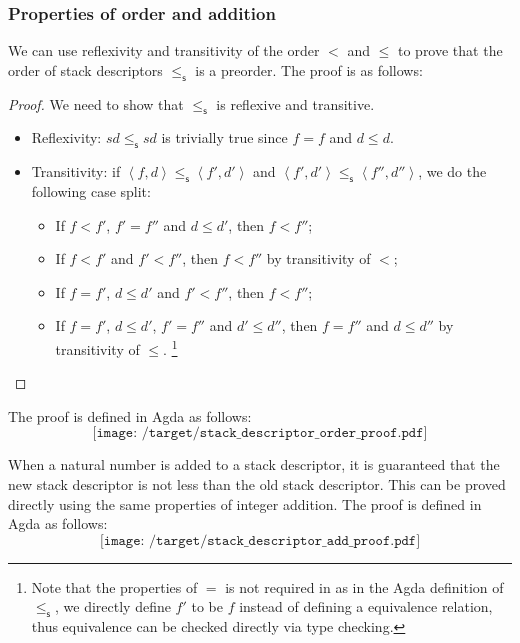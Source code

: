 \documentclass[12pt,a4paper]{report}
\theoremstyle{definition}
\newcommand{\ang}[1]{\left\langle #1 \right\rangle}
\begin{document}
    \subsubsection{Properties of order and addition}
    We can use reflexivity and transitivity of the order $<$ and $\leq$ to prove that the order of stack descriptors $\leq_\mathsf{s}$ is a preorder. The proof is as follows:
    \begin{proof}
        We need to show that $\leq_\mathsf{s}$ is reflexive and transitive. 
        \begin{itemize}
            \item 
                Reflexivity: $sd \leq_\mathsf{s} sd$ is trivially true since $f = f$ and $d \leq d$.
            \item
                Transitivity: if $\ang{f, d} \leq_\mathsf{s} \ang{f', d'}$ and $\ang{f', d'} \leq_\mathsf{s} \ang{f'', d''}$, we do the following case split:
                \begin{itemize}
                    \item 
                        If $f < f'$, $f' = f''$ and $d \leq d'$, then $f < f''$; 
                    \item 
                        If $f < f'$ and $f' < f''$, then $f < f''$ by transitivity of $<$;
                    \item
                        If $f = f'$, $d \leq d'$ and $f' < f''$, then $f < f''$;
                    \item
                        If $f = f'$, $d \leq d'$, $f' = f''$ and $d' \leq d''$, then $f = f''$ and $d \leq d''$ by transitivity of $\leq$. \footnote{Note that the properties of $=$ is not required in as in the Agda definition of $\leq_\mathsf{s}$, we directly define $f'$ to be $f$ instead of defining a equivalence relation, thus equivalence can be checked directly via type checking.}
                \end{itemize}
        \end{itemize}
    \end{proof}

    The proof is defined in Agda as follows:
    \[\texttt{[image: /target/stack\_descriptor\_order\_proof.pdf]}\]

    When a natural number is added to a stack descriptor, it is guaranteed that the new stack descriptor is not less than the old stack descriptor. This can be proved directly using the same properties of integer addition. The proof is defined in Agda as follows:
    \[\texttt{[image: /target/stack\_descriptor\_add\_proof.pdf]}\]
    
\end{document}
